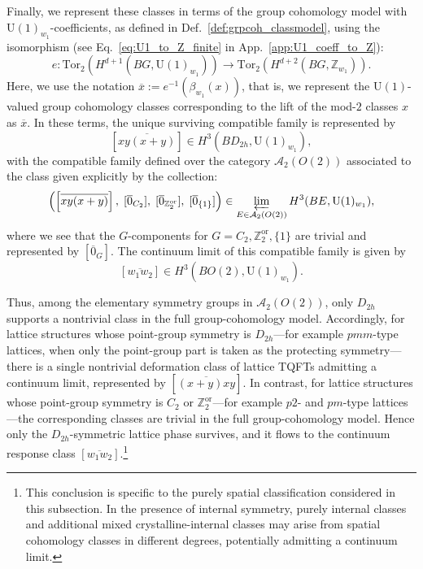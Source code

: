 \documentclass[aps,prx,reprint,superscriptaddress,twocolumn,amsmath,amssymb,amsfonts, nofootinbib]{revtex4-2}
\newcommand{\U}{\text{U}}
\newcommand{\qa}{\mathcal{A}_{2}}
\newcommand{\tor}{\text{Tor}}
\newcommand{\Z}{\mathbb{Z}}
\theoremstyle{apsstyle}
\begin{document}
Finally, we represent these classes in terms of the group cohomology model with $\U(1)_{w_{1}}$-coefficients, as defined in Def.~\ref{def:grpcoh_classmodel}, using the isomorphism (see Eq.~\ref{eq:U1_to_Z_finite} in App.~\ref{app:U1_coeff_to_Z}): 
\begin{equation}
    e: \tor_{2}\left(H^{d+1}(BG, \U(1)_{w_{1}}) \right)\rightarrow \tor_{2}\left(H^{d+2}(BG, \Z_{w_{1}})\right).
    \label{eq:e}
\end{equation}
Here, we use the notation $\overline{x}:= e^{-1}(\beta_{w_{1}}(x))$, that is, we represent the $\U(1)$-valued group cohomology classes corresponding to the lift of the mod-$2$ classes $x$ as $\overline{x}$. 
In these terms, the unique surviving compatible family is represented by
\begin{equation*}
\left[\overline{xy(x+y)}\right] \in H^{3}(BD_{2h}, \U(1)_{w_{1}}),
\end{equation*} 
with the compatible family defined over the category $\mathcal{A}_{2}(O(2))$ associated to the class given explicitly by the collection:
\begin{equation*}
    \left(\left[\overline{xy(x+y)}\right], \;[\overline{0}_{C_{2}}],\;[\overline{0}_{\Z_{2}^{\mathrm{or}}}],\;[\overline{0}_{\{1\}}]\right)\in \varprojlim_{E\in \qa(O(2))} H^{3}(BE, \U(1)_{w_{1}}),
\end{equation*}
where we see that the $G$-components for $G=C_{2},\Z_{2}^{\mathrm{or}}, \{1\}$ are trivial and represented by $[\overline{0}_{G}]$. The continuum limit of this compatible family is given by
\begin{equation*}
    \left[\overline{w_1w_2}\right]\in H^{3}(BO(2), \U(1)_{w_{1}}).
\end{equation*}

Thus, among the elementary symmetry groups in $\qa(O(2))$, only $D_{2h}$ supports a nontrivial class in the full group-cohomology model. Accordingly, for lattice structures whose point-group symmetry is $D_{2h}$—for example $pmm$-type lattices, when only the point-group part is taken as the protecting symmetry—there is a single nontrivial deformation class of lattice TQFTs admitting a continuum limit, represented by $[\overline{(x+y)xy}]$. In contrast, for lattice structures whose point-group symmetry is $C_{2}$ or $\Z_{2}^{\mathrm{or}}$—for example $p2$- and $pm$-type lattices—the corresponding classes are trivial in the full group-cohomology model. Hence only the $D_{2h}$-symmetric lattice phase survives, and it flows to the continuum response class $[\overline{w_{1}w_{2}}]$.\footnote{This conclusion is specific to the purely spatial classification considered in this subsection. In the presence of internal symmetry, purely internal classes and additional mixed crystalline-internal classes may arise from spatial cohomology classes in different degrees, potentially admitting a continuum limit.}
\end{document}
